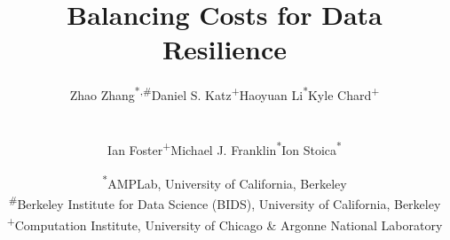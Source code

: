 \documentclass{sig-alternate}
\begin{document}

\title{Balancing Costs for Data Resilience}

\author{
\begin{tabular}{cccc}
{Zhao Zhang\textsuperscript{*,\#}} & {Daniel S. Katz\textsuperscript{+}} & {Haoyuan Li\textsuperscript{*}} & {Kyle Chard\textsuperscript{+}} 
\end{tabular}
\\
\begin{tabular}{ccc}
{Ian Foster\textsuperscript{+}} & {Michael J. Franklin\textsuperscript{*}} & {Ion Stoica\textsuperscript{*}}
\end{tabular}
\and %
\begin{tabular}{c}
\textsuperscript{*}AMPLab, University of California, Berkeley \\
\textsuperscript{\#}Berkeley Institute for Data Science (BIDS), University of California, Berkeley \\
\textsuperscript{+}Computation Institute, University of Chicago \& Argonne National Laboratory
\end{tabular}
} 

\maketitle

\end{document}
